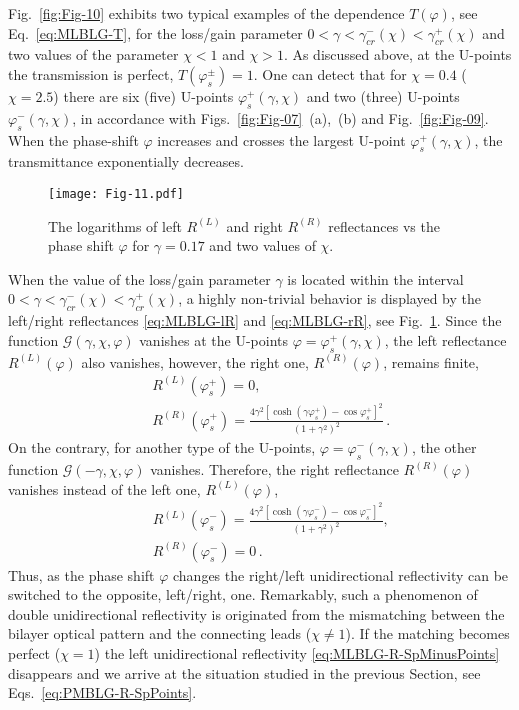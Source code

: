 \documentclass[aps,pra,reprint,showpacs,bibnotes,preprintnumbers,twoside,eqsecnum]{revtex4-1}
\begin{document}
Fig.~\ref{fig:Fig-10} exhibits two typical examples of the dependence $T(\varphi)$, see Eq.~\eqref{eq:MLBLG-T}, for the loss/gain parameter $0<\gamma<\gamma_{cr}^{-}(\chi)<\gamma_{cr}^{+}(\chi)$ and two values of the parameter $\chi<1$ and $\chi>1$. As discussed above, at the U-points  the transmission is perfect, $T(\varphi_s^{\pm})=1$. One can detect that for $\chi=0.4$ ($\chi=2.5$) there are six (five) U-points $\varphi_s^{+}(\gamma,\chi)$ and two (three) U-points $\varphi_s^{-}(\gamma,\chi)$, in accordance with Figs.~\ref{fig:Fig-07}~(a),~(b) and Fig.~\ref{fig:Fig-09}. When the phase-shift $\varphi$ increases and crosses the largest U-point $\varphi_s^{+}(\gamma,\chi)$, the transmittance exponentially decreases.

\begin{figure}[!ht]
\centering
\texttt{[image: Fig-11.pdf]}
\caption{The logarithms of left $R^{(L)}$ and right $R^{(R)}$ reflectances vs the phase shift $\varphi$ for $\gamma=0.17$ and two values of $\chi$.}\label{fig:Fig-11}
\end{figure}

When the value of the loss/gain parameter $\gamma$ is located within the interval $0<\gamma<\gamma_{cr}^{-}(\chi)<\gamma_{cr}^{+}(\chi)$, a highly non-trivial behavior is displayed by the left/right reflectances \eqref{eq:MLBLG-lR} and \eqref{eq:MLBLG-rR}, see Fig.~\ref{fig:Fig-11}. Since the function $\mathcal{G}(\gamma,\chi,\varphi)$ vanishes at the U-points $\varphi=\varphi^{+}_s(\gamma,\chi)$, the left reflectance $R^{(L)}(\varphi)$ also vanishes, however, the right one, $R^{(R)}(\varphi)$, remains finite,
%
\begin{eqnarray}
&&R^{(L)}(\varphi^{+}_s)=0,\label{eq:MLBLG-R-SpPlusPoints}\\
&&R^{(R)}(\varphi^{+}_s)=\frac{4\gamma^2[\cosh(\gamma\varphi^{+}_s)-\cos\varphi^{+}_s]^2}{(1+\gamma^2)^{2}}\,.\nonumber
\end{eqnarray}
On the contrary, for another type of the U-points, $\varphi=\varphi^{-}_s(\gamma,\chi)$, the other function $\mathcal{G}(-\gamma,\chi,\varphi)$ vanishes. Therefore, the right reflectance $R^{(R)}(\varphi)$ vanishes instead of the left one, $R^{(L)}(\varphi)$,
%
\begin{eqnarray}
&&R^{(L)}(\varphi^{-}_s)=\frac{4\gamma^2[\cosh(\gamma\varphi^{-}_s)-\cos\varphi^{-}_s]^2}{(1+\gamma^2)^{2}},\nonumber\\
&&R^{(R)}(\varphi^{-}_s)=0\,.\label{eq:MLBLG-R-SpMinusPoints}
\end{eqnarray}
Thus, as the phase shift $\varphi$ changes the right/left unidirectional reflectivity can be switched to the opposite, left/right, one. Remarkably, such a phenomenon of double unidirectional reflectivity is originated from the mismatching between the bilayer optical pattern and the connecting leads ($\chi\neq1$). If the matching becomes perfect ($\chi=1$) the left unidirectional reflectivity \eqref{eq:MLBLG-R-SpMinusPoints} disappears and we arrive at the situation studied in the previous Section, see Eqs.~\eqref{eq:PMBLG-R-SpPoints}.
\end{document}
